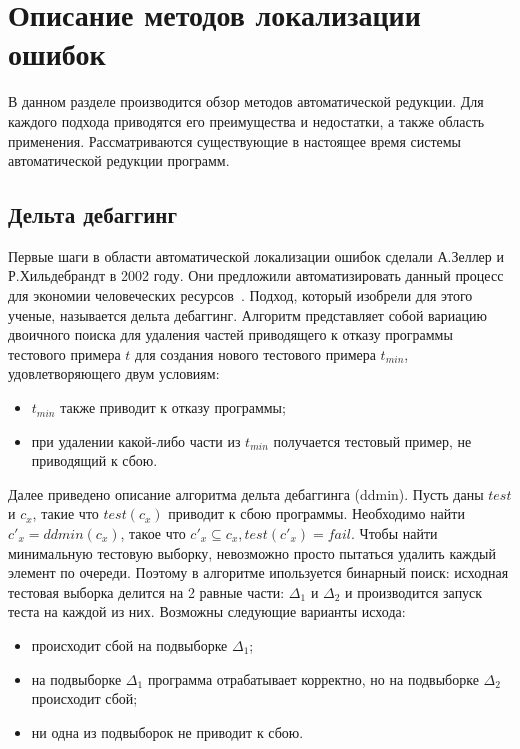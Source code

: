 \chapter{Описание методов локализации ошибок}
В данном разделе производится обзор методов автоматической редукции. Для каждого подхода приводятся его преимущества и недостатки, а также область применения. Рассматриваются существующие в настоящее время системы автоматической редукции программ.
\section{Дельта дебаггинг}
Первые шаги в области автоматической локализации ошибок сделали А.Зеллер и Р.Хильдебрандт в 2002 году. Они предложили автоматизировать данный процесс для экономии человеческих ресурсов~\cite{zeller2002simplifying}. Подход, который изобрели для этого ученые, называется дельта дебаггинг. Алгоритм представляет собой вариацию двоичного поиска для удаления частей приводящего к отказу программы тестового примера $t$ для создания нового тестового примера $t_{min}$, удовлетворяющего двум условиям:
\begin{itemize}
\item $t_{min}$ также приводит к отказу программы;
\item при удалении какой-либо части из $t_{min}$ получается тестовый пример, не приводящий к сбою.
\end{itemize}
Далее приведено описание алгоритма дельта дебаггинга (ddmin). Пусть даны $test$ и $c_x$, такие что $test(c_x)$ приводит к сбою программы. Необходимо найти $c'_x = ddmin(c_x)$, такое что $c'_x \subseteq c_x, test(c'_x) = fail$. Чтобы найти минимальную тестовую выборку, невозможно просто пытаться удалить каждый элемент по очереди. Поэтому в алгоритме ипользуется бинарный поиск: исходная тестовая выборка делится на 2 равные части: $\Delta_1$ и $\Delta_2$ и производится запуск теста на каждой из них. Возможны следующие варианты исхода:
\begin{itemize}
\item происходит сбой на подвыборке $\Delta_1$;
\item на подвыборке $\Delta_1$ программа отрабатывает корректно, но на подвыборке $\Delta_2$ происходит сбой;
\item ни одна из подвыборок не приводит к сбою.
\end{itemize}
